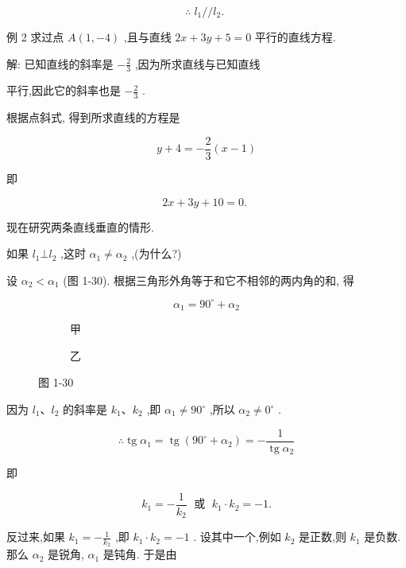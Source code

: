 \documentclass[lang=cn,newtx,10.5pt,scheme=chinese]{elegantbook}
\begin{document}
\[
  \therefore \;{l}_{1}//{l}_{2}\text{. }
\]

例 2 求过点 \(A\left( {1, - 4}\right)\) ,且与直线 \({2x} + {3y} + 5 = 0\) 平行的直线方程.

解: 已知直线的斜率是 \(- \frac{2}{3}\) ,因为所求直线与已知直线

平行,因此它的斜率也是 \(- \frac{2}{3}\) .

根据点斜式, 得到所求直线的方程是

\[
  y + 4 = - \frac{2}{3}\left( {x - 1}\right)
\]

即

\[
    {2x} + {3y} + {10} = 0\text{. }
\]

现在研究两条直线垂直的情形.

如果 \({l}_{1} \bot {l}_{2}\) ,这时 \({\alpha }_{1} \neq {\alpha }_{2}\) ,(为什么?)

设 \({\alpha }_{2} < {\alpha }_{1}\) (图 1-30). 根据三角形外角等于和它不相邻的两内角的和, 得

\[
    {\alpha }_{1} = {90}^{ \circ } + {\alpha }_{2}
\]

\begin{figure}[h]
	\centering
	\begin{subfigure}[h]{0.45\textwidth}
		\centering
		
		\caption{甲}
	\end{subfigure}
	\hfill %
	\begin{subfigure}[h]{0.45\textwidth}
		\centering
		
		\caption{乙}
	\end{subfigure}
	\caption{图 1-30}
\end{figure}

因为 \({l}_{1}\text{、}{l}_{2}\) 的斜率是 \({k}_{1}\text{、}{k}_{2}\) ,即 \({\alpha }_{1} \neq {90}^{ \circ }\) ,所以 \({\alpha }_{2} \neq {0}^{ \circ }\) .

\[
  \therefore \operatorname{tg}{\alpha }_{1} = \operatorname{tg}\left( {{90}^{ \circ } + {\alpha }_{2}}\right) = - \frac{1}{\operatorname{tg}{\alpha }_{2}}
\]

即

\[
    {k}_{1} = - \frac{1}{{k}_{2}}\;\text{ 或 }\;{k}_{1} \cdot {k}_{2} = - 1.
\]

反过来,如果 \({k}_{1} = - \frac{1}{{k}_{2}}\) ,即 \({k}_{1} \cdot {k}_{2} = - 1\) . 设其中一个,例如 \({k}_{2}\) 是正数,则 \({k}_{1}\) 是负数. 那么 \({\alpha }_{2}\) 是锐角, \({\alpha }_{1}\) 是钝角. 于是由
\end{document}
